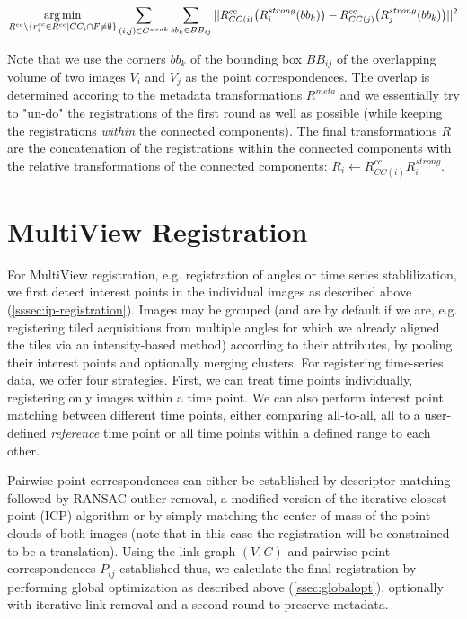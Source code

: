 \begin{equation}
\label{eq:globalopt-eq4}
\operatorname*{arg\,min}_{R^{cc} \setminus \{ r^{cc}_{i} \in R^{cc} | CC_i \cap F \neq \emptyset \}} \sum_{(i,j) \in C^{weak}} \sum_{bb_{k} \in BB_{ij}} || R^{cc}_{CC(i)}\big( R^{strong}_{i}( bb_{k})\big) -  R^{cc}_{CC(j)}\big( R^{strong}_{j}( bb_{k}) \big) ||^2 
\end{equation}

Note that we use the corners $bb_k$ of the bounding box $BB_{ij}$ of the overlapping volume of two images $V_i$ and $V_j$ as the point correspondences. The overlap is determined accoring to the metadata transformations $R^{meta}$ and we essentially try to "un-do" the registrations of the first round as well as possible (while keeping the registrations \emph{within} the connected components). The final transformations $R$ are the concatenation of the registrations within the connected components with the relative transformations of the connected components: $R_{i} \leftarrow R^{cc}_{CC(i)} R^{strong}_{i}$.

\section{MultiView Registration}

For MultiView registration, e.g. registration of angles or time series stablilization, we first detect interest points in the individual images as described above (\ref{sssec:ip-registration}). Images may be grouped (and are by default if we are, e.g. registering tiled acquisitions from multiple angles for which we already aligned the tiles via an intensity-based method) according to their attributes, by pooling their interest points and optionally merging clusters. For registering time-series data, we offer four strategies. First, we can treat time points individually, registering only images within a time point. We can also perform interest point matching between different time points, either comparing all-to-all, all to a user-defined \emph{reference} time point or all time points within a defined range to each other.

Pairwise point correspondences can either be established by descriptor matching followed by RANSAC outlier removal, a modified version of the iterative closest point (ICP) algorithm or by simply matching the center of mass of the point clouds of both images (note that in this case the registration will be constrained to be a translation). Using the link graph $(V,C)$ and pairwise point correspondences $P_{ij}$ established thus, we calculate the final registration by performing global optimization as described above (\ref{ssec:globalopt}), optionally with iterative link removal and a second round to preserve metadata.

